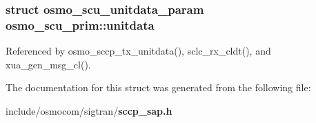 \subsubsection[{unitdata}]{\setlength{\rightskip}{0pt plus 5cm}struct {\bf osmo\+\_\+scu\+\_\+unitdata\+\_\+param} osmo\+\_\+scu\+\_\+prim\+::unitdata}\label{structosmo__scu__prim_a79602dc9720157f71fdf70581ead993a}


Referenced by osmo\+\_\+sccp\+\_\+tx\+\_\+unitdata(), sclc\+\_\+rx\+\_\+cldt(), and xua\+\_\+gen\+\_\+msg\+\_\+cl().



The documentation for this struct was generated from the following file\+:\begin{DoxyCompactItemize}
\item 
include/osmocom/sigtran/{\bf sccp\+\_\+sap.\+h}\end{DoxyCompactItemize}
